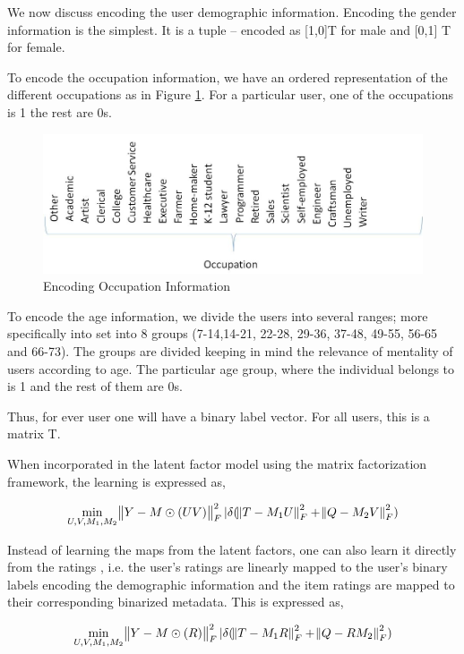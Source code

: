\documentclass[conference]{IEEEtran}
\begin{document}
We now discuss encoding the user demographic information. Encoding the gender information is the simplest. It is a tuple – encoded as [1,0]T for male and [0,1] T for female.

To encode the occupation information, we have an ordered representation of the different occupations as in Figure \ref{fig:occ_vector}. For a particular user, one of the occupations is 1 the rest are 0s.
  
  \begin{figure}
    \centering
      \includegraphics[width=0.6\linewidth]{occ_vector.png}
        \caption{Encoding Occupation Information}
        \label{fig:occ_vector}
  \end{figure}

To encode the age information, we divide the users into several ranges; more specifically into set into 8 groups (7-14,14-21, 22-28, 29-36, 37-48, 49-55, 56-65 and 66-73). The groups are divided keeping in mind the relevance of mentality of users according to age. The particular age group, where the individual belongs to is 1 and the rest of them are 0s.

Thus, for ever user one will have a binary label vector. For all users, this is a matrix T.

When incorporated in the latent factor model \cite{gogna2016supervised} using the matrix factorization framework, the learning is expressed as,

\begin{equation}
  \min_{U,V,M_1,M_2} \norm{Y-M \odot (UV)}^2_F | \delta(\norm{T - M_1 U}^2_F + \norm{Q - M_2 V}^2_F)
\end{equation}

Instead of learning the maps from the latent factors, one can also learn it directly from the ratings \cite{gogna2016supervised}, i.e. the user’s ratings are linearly mapped to the user’s binary labels encoding the demographic information and the item ratings are mapped to their corresponding binarized metadata. This is expressed as,

\begin{equation}
  \min_{U,V,M_1,M_2} \norm{Y-M \odot (R)}^2_F | \delta(\norm{T - M_1 R}^2_F + \norm{Q - R M_2}^2_F)
\end{equation}
\end{document}
